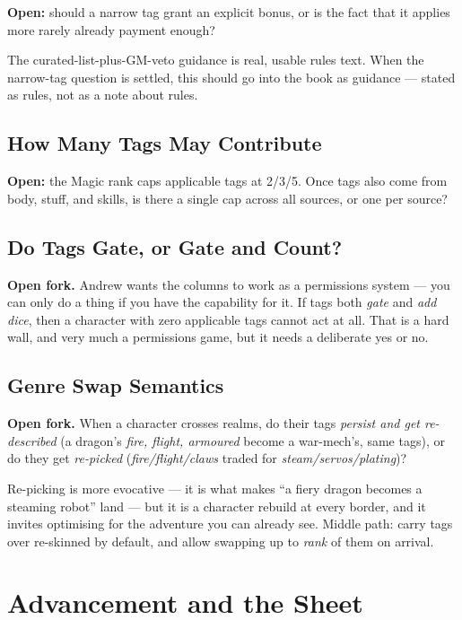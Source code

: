 \documentclass[11pt,oneside]{memoir}
\newcommand{\where}[1]{\par\smallskip{\small\itshape\color{atrAccent2}Was in: #1}\par}
\begin{document}
\textbf{Open:} should a narrow tag grant an explicit bonus, or is the fact
that it applies more rarely already payment enough?

\begin{notebox}
The curated-list-plus-GM-veto guidance is real, usable rules text. When the
narrow-tag question is settled, this should go into the book as guidance ---
stated as rules, not as a note about rules.
\end{notebox}
\where{Magic --- How Magic Works}

\section{How Many Tags May Contribute}
\textbf{Open:} the Magic rank caps applicable tags at 2/3/5. Once tags also
come from body, stuff, and skills, is there a single cap across all sources,
or one per source?

\section{Do Tags Gate, or Gate and Count?}
\textbf{Open fork.} Andrew wants the columns to work as a permissions system
--- you can only do a thing if you have the capability for it. If tags both
\emph{gate} and \emph{add dice}, then a character with zero applicable tags
cannot act at all. That is a hard wall, and very much a permissions game,
but it needs a deliberate yes or no.

\section{Genre Swap Semantics}
\textbf{Open fork.} When a character crosses realms, do their tags
\emph{persist and get re-described} (a dragon's \emph{fire, flight,
armoured} become a war-mech's, same tags), or do they get \emph{re-picked}
(\emph{fire/flight/claws} traded for \emph{steam/servos/plating})?

Re-picking is more evocative --- it is what makes ``a fiery dragon becomes a
steaming robot'' land --- but it is a character rebuild at every border, and
it invites optimising for the adventure you can already see. Middle path:
carry tags over re-skinned by default, and allow swapping up to \emph{rank}
of them on arrival.

\chapter{Advancement and the Sheet}
\end{document}
